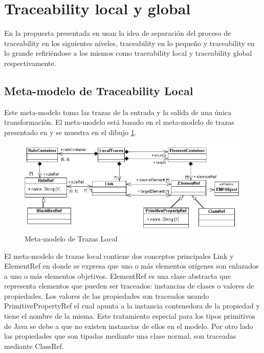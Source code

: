 \documentclass[a4paper,12pt,oneside]{book}
\begin{document}
\section{Traceability local y global}

En la propuesta presentada en \cite{GlitiaEtienDumoulin} usan la idea de separación del proceso de traceability en los siguientes niveles, traceability en lo pequeño y traceability en lo grande refiriéndose a los mismos como traceability local y traceability global respectivamente.

\subsection{Meta-modelo de Traceability Local}

Este meta-modelo toma las trazas de la entrada y la salida de una única transformación. El meta-modelo está basado en el meta-modelo de trazas presentado en \cite{Jouault} y se muestra en el dibujo \ref{fig:LocalTraceMetamodel}.

\begin{figure}[hbtp]
\centering
\includegraphics[scale=.55]{./img/LocalTraceMetamodel}
\caption{Meta-modelo de Trazas Local}
\label{fig:LocalTraceMetamodel}
\end{figure}

El meta-modelo de trazas local contiene dos conceptos principales Link y ElementRef en donde se expresa que uno o más elementos orígenes son enlazados a uno o más elementos objetivos. ElementRef es una clase abstracta que representa elementos que pueden ser traceados: instancias de clases o valores de propiedades. Los valores de las propiedades son traceados usando PrimitivePropertyRef el cual apunta a la instancia contenedora de la propiedad y tiene el nombre de la misma. Este tratamiento especial para los tipos primitivos de Java se debe a que no existen instancias de ellos en el modelo. Por otro lado las propiedades que son tipadas mediante una clase normal, son traceadas mediante ClassRef.
\end{document}
